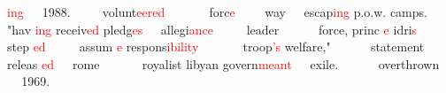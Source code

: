 \documentclass[english]{beamer}
\begin{document}
\begin{frame}
\textcolor{red}{ing} \textcolor{white}{in} 1988. \textcolor{white}{they}
volunt\textcolor{red}{eered} \textcolor{white}{for} \textcolor{white}{the}
forc\textcolor{red}{e} \textcolor{white}{as} \textcolor{white}{a} way %
\textcolor{white}{of} escap\textcolor{red}{ing} p.o.w. camps. "hav%
\textcolor{red}{ing} receiv\textcolor{red}{ed} pledg\textcolor{red}{es} %
\textcolor{white}{of} allegi\textcolor{red}{ance} \textcolor{white}{from}
leader \textcolor{white}{of} \textcolor{white}{the} force, princ%
\textcolor{red}{e} idri\textcolor{red}{s} \textcolor{white}{has} step%
\textcolor{red}{ed} \textcolor{white}{in} \textcolor{white}{to} assum%
\textcolor{red}{e} respons\textcolor{red}{ibility} \textcolor{white}{for} %
\textcolor{white}{the} troop\textcolor{red}{'s} welfare," %
\textcolor{white}{said} \textcolor{white}{a} statement releas%
\textcolor{red}{ed} \textcolor{white}{in} rome \textcolor{white}{by} %
\textcolor{white}{the} royalist libyan govern\textcolor{red}{meant} %
\textcolor{white}{in} exile. \textcolor{white}{it} \textcolor{white}{was}
overthrown \textcolor{white}{in} 1969.
\end{frame}
%
\end{document}

